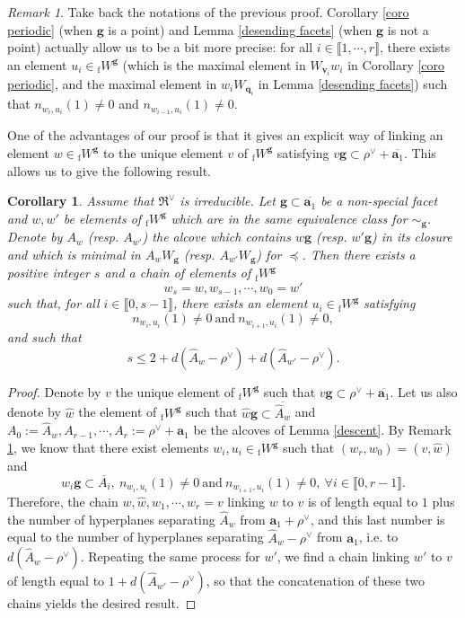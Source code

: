 \documentclass[11pt]{amsart}
\theoremstyle{plain}
\newtheorem{coro}[thm]{Corollary}
\theoremstyle{remark}
\newtheorem{rem}[thm]{Remark}
\numberwithin{equation}{section}
\begin{document}
	\begin{rem}\label{precise link}
	    Take back the notations of the previous proof. Corollary \ref{coro periodic} (when $\mathbf{g}$ is a point) and Lemma \ref{desending facets} (when $\mathbf{g}$ is not a point) actually allow us to be a bit more precise: for all $i\in\llbracket1,\cdots,r\rrbracket$, there exists an element $u_i\in{_\mathrm{f}W}^\mathbf{g}$ (which is the maximal element in $W_{\mathbf{v}_i}w_i$ in Corollary \ref{coro periodic}, and the maximal element in $w_iW_{\mathbf{q}_i}$ in  Lemma \ref{desending facets}) such that $n_{w_i,u_i}(1)\neq0$ and $n_{w_{i-1},u_i}(1)\neq0$.
	\end{rem}
	One of the advantages of our proof is that it gives an explicit way of linking an element $w\in{_\mathrm{f}W}^\mathbf{g}$ to the unique element $v$ of ${_\mathrm{f}W}^\mathbf{g}$ satisfying $v\mathbf{g}\subset \rho^\vee+\overline{\mathbf{a}_1}$. This allows us to give the following result.
	\begin{coro}\label{bound}
		Assume that $\mathfrak{R}^\vee$ is irreducible. Let $\mathbf{g}\subset\overline{\mathbf{a}_1}$ be a non-special facet and $w,w'$ be elements of $ {_\mathrm{f}W}^\mathbf{g}$ which are in the same equivalence class for $\sim_\mathbf{g}$. Denote by $A_w$ (resp. $A_{w'}$) the alcove which contains $w\mathbf{g}$ (resp. $w'\mathbf{g}$) in its closure and which is minimal in $A_wW_\mathbf{g}$ (resp. $A_{w'}W_\mathbf{g}$) for $\preceq$. Then there exists a positive integer $s$ and a chain of elements of ${_\mathrm{f}W}^\mathbf{g}$
		$$w_s=w,w_{s-1},\cdots,w_0=w' $$
		such that, for all $i\in\llbracket 0,s-1\rrbracket$, there exists an element $u_i\in {_\mathrm{f}W}^\mathbf{g}$ satisfying
		$${ n}_{w_i,u_i}(1)\neq 0~\text{and}~{ n}_{w_{i+1},u_i}(1)\neq 0, $$
		and such that
		$$s\leq 2+d(\hat{A}_w-\rho^\vee)+d(\hat{A}_{w'}-\rho^\vee). $$
	\end{coro}
	\begin{proof}
		Denote by $v$ the unique element of ${_\mathrm{f}W}^\mathbf{g}$ such that $v\mathbf{g}\subset\rho^\vee+\overline{\mathbf{a}_1}$. Let us also denote by $\hat{w}$ the element of ${_\mathrm{f}W}^\mathbf{g}$ such that $\hat{w}\mathbf{g}\subset \overline{\hat{A}_w}$ and $A_0:=\hat{A}_w,A_{r-1},\cdots,A_r:=\rho^\vee+\mathbf{a}_1$ be the alcoves of Lemma \ref{descent}. By Remark \ref{precise link}, we know that there exist elements $w_i,u_i\in {_\mathrm{f}W}^\mathbf{g}$ such that $(w_r,w_0)=(v,\hat{w})$ and
		$$w_i\mathbf{g}\subset \overline{A_i},~n_{w_i,u_i}(1)\neq0~\text{and}~n_{w_{i+1},u_i}(1)\neq0,~\forall i\in \llbracket 0,r-1\rrbracket .$$
		Therefore, the chain $w,\hat{w},w_1,\cdots,w_r=v$ linking $w$ to $v$ is of length equal to $1$ plus the number of hyperplanes separating $\hat{A}_w$ from $\mathbf{a}_1+\rho^\vee$, and this last number is equal to the number of hyperplanes separating $\hat{A}_w-\rho^\vee$ from $\mathbf{a}_1$, i.e. to $d(\hat{A}_w-\rho^\vee)$. Repeating the same process for $w'$, we find a chain linking $w'$ to $v$ of length equal to $1+d(\hat{A}_{w'}-\rho^\vee)$, so that the concatenation of these two chains yields the desired result.
	\end{proof}
	
\end{document}

